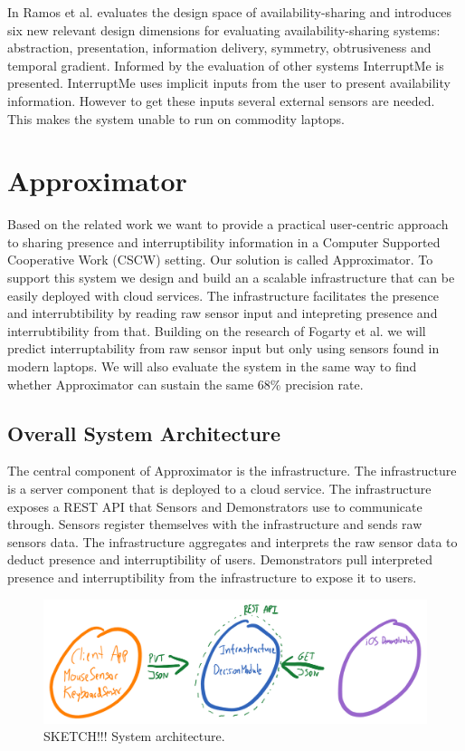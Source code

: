 \documentclass{sigchi}
\begin{document}
In \cite{hincapie2011design} Ramos et al. evaluates the design space of availability-sharing and introduces six new relevant design dimensions for evaluating availability-sharing systems: abstraction, presentation, information delivery, symmetry, obtrusiveness and temporal gradient.
Informed by the evaluation of other systems InterruptMe is presented.
InterruptMe uses implicit inputs from the user to present availability information.
However to get these inputs several external sensors are needed.
This makes the system unable to run on commodity laptops.

\section{Approximator}

Based on the related work we want to provide a practical user-centric approach to sharing presence and interruptibility information in a Computer Supported Cooperative Work (CSCW) setting.
Our solution is called Approximator.
To support this system we design and build an a scalable infrastructure that can be easily deployed with cloud services.
The infrastructure facilitates the presence and interrubtibility by reading raw sensor input and intepreting presence and interrubtibility from that.
Building on the research of Fogarty et al.\cite{fogarty2005predicting} we will predict interruptability from raw sensor input but only using sensors found in modern laptops. We will also evaluate the system in the same way to find whether Approximator can sustain the same 68\% precision rate.

\subsection{Overall System Architecture}

The central component of Approximator is the infrastructure.
The infrastructure is a server component that is deployed to a cloud service.
The infrastructure exposes a REST API that Sensors and Demonstrators use to communicate through.
Sensors register themselves with the infrastructure and sends raw sensors data.
The infrastructure aggregates and interprets the raw sensor data to deduct presence and interruptibility of users.
Demonstrators pull interpreted presence and interruptibility from the infrastructure to expose it to users.


\begin{figure}[H]
  \centering
  \includegraphics[width=\columnwidth]{figures/architecture.png}
  \caption{SKETCH!!! System architecture.}
  \label{fig:architecture}
\end{figure}
\end{document}
